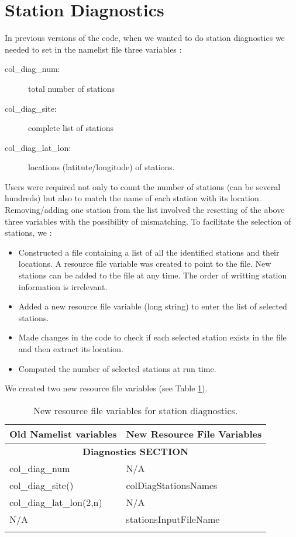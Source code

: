 %
\section{Station Diagnostics}
In previous versions of the code, when we wanted to do station diagnostics we
needed to set in the namelist file three variables :
%
\begin{description}
\item[col\_diag\_num:] total number of stations
\item[col\_diag\_site:] complete list of stations
\item[col\_diag\_lat\_lon:] locations (latitute/longitude) of stations.
\end{description}
%
Users were required not only to count the number of stations (can be several hundreds)
 but also to match the name of each station with its location.
Removing/adding one station from the list involved the resetting of
the above three variables with the possibility of mismatching.
To facilitate the selection of stations, we :
%
\begin{itemize}
\item Constructed a file containing a list of all the identified stations and their locations.
      A resource file variable was created to point to the file. New stations can be added
      to the file at any time. The order of writting station information is irrelevant.
\item Added a new resource file variable (long string) to enter the list of selected stations.
\item Made changes in the code to check if each selected station exists in the file and then extract
      its location.
\item Computed the number of selected stations at run time.
\end{itemize}
%
We created two new resource file variables (see Table \ref{tab:nlColDiag}).
%
\begin{center}
\begin{longtable}{|l|l|} \hline\hline
{\bf Old Namelist variables} & {\bf New Resource File Variables} \\ \hline\hline
\multicolumn{2}{|c|}{\bf Diagnostics SECTION } \\ \hline\hline
col\_diag\_num            & N/A     \\
col\_diag\_site()         & colDiagStationsNames \\
col\_diag\_lat\_lon(2,n)  & N/A                  \\
N/A                       & stationsInputFileName \\ \hline\hline
\caption{New resource file variables for station diagnostics.}
\label{tab:nlColDiag}
\end{longtable}
\end{center}
